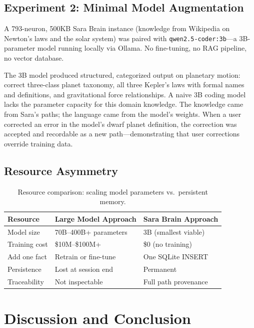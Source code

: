\documentclass[runningheads]{llncs}
\begin{document}
\subsection{Experiment 2: Minimal Model Augmentation}

A 793-neuron, 500KB Sara Brain instance (knowledge from Wikipedia on Newton's laws and the solar system) was paired with \texttt{qwen2.5-coder:3b}---a 3B-parameter model running locally via Ollama. No fine-tuning, no RAG pipeline, no vector database.

The 3B model produced structured, categorized output on planetary motion: correct three-class planet taxonomy, all three Kepler's laws with formal names and definitions, and gravitational force relationships. A naive 3B coding model lacks the parameter capacity for this domain knowledge. The knowledge came from Sara's paths; the language came from the model's weights. When a user corrected an error in the model's dwarf planet definition, the correction was accepted and recordable as a new path---demonstrating that user corrections override training data.

\subsection{Resource Asymmetry}

\begin{table}[h]
\centering
\caption{Resource comparison: scaling model parameters vs.\ persistent memory.}
\label{tab:resources}
\begin{tabular}{@{}lll@{}}
\toprule
Resource & Large Model Approach & Sara Brain Approach \\
\midrule
Model size & 70B--400B+ parameters & 3B (smallest viable) \\
Training cost & \$10M--\$100M+ & \$0 (no training) \\
Add one fact & Retrain or fine-tune & One SQLite INSERT \\
Persistence & Lost at session end & Permanent \\
Traceability & Not inspectable & Full path provenance \\
\bottomrule
\end{tabular}
\end{table}

\section{Discussion and Conclusion}
\end{document}
